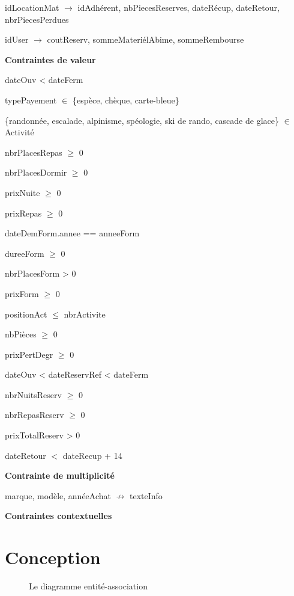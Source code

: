 \documentclass[12pt, a4paper]{article}
\begin{document}
idLocationMat $\rightarrow$ idAdhérent, nbPiecesReserves, dateRécup, dateRetour, nbrPiecesPerdues

idUser $\rightarrow$ coutReserv, sommeMateriélAbime, sommeRembourse

\textbf{Contraintes de valeur}

dateOuv < dateFerm

typePayement $\in$ \{espèce, chèque, carte-bleue\}

\{randonnée, escalade, alpinisme, spéologie, ski de rando, cascade de glace\} $\in$ Activité

nbrPlacesRepas $\geq$ 0

nbrPlacesDormir $\geq$ 0

prixNuite $\geq$ 0

prixRepas $\geq$ 0

dateDemForm.annee == anneeForm

dureeForm $\geq$ 0

nbrPlacesForm > 0

prixForm $\geq$ 0

positionAct $\leq$ nbrActivite

nbPièces $\geq$ 0

prixPertDegr $\geq$ 0

dateOuv < dateReservRef < dateFerm

nbrNuitsReserv $\geq$ 0

nbrRepasReserv $\geq$ 0

prixTotalReserv > 0

dateRetour $<$ dateRecup + 14

\textbf{Contrainte de multiplicité}

marque, modèle, annéeAchat $\not\rightarrow$ texteInfo


\textbf{Contraintes contextuelles}

\section{Conception}
\begin{figure}[h]

\caption{Le diagramme entité-association}
\end{figure}
\end{document}
